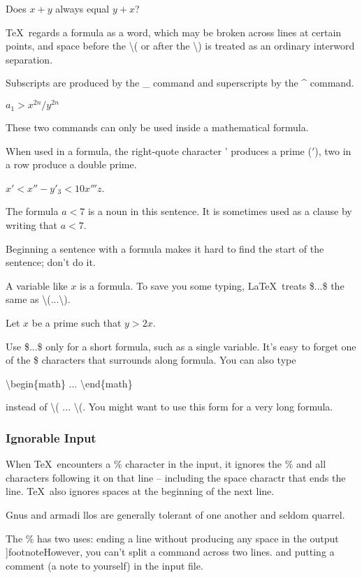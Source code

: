 \documentclass[twocolumn]{article}        %
\begin{document}
Does \( x + y \) always equal \(y+x\)?

\TeX\ regards a formula as a word, which may be broken across lines at certain points, 
and space before the \textbackslash (  or after the \textbackslash ) is treated as an 
ordinary interword separation.

Subscripts are produced by the \_ command and superscripts by the \^{} command.

\( a_{1} > x^{2n} / y^{2n} \)

These two commands can only be used inside a mathematical formula.

When used in a formula, the right-quote character ' produces a prime (\('\)),
two in a row produce a double prime.

\break
\( x' < x'' - y'_{3} < 10 x''' z\).

The formula \( a<7 \) is a noun in this sentence.
It is sometimes used as a clause by writing that \( a<7 \).

Beginning a sentence with a formula makes it hard to find the start of the 
sentence; don't do it.

A variable like \( x \) is a formula. To save you some typing, \LaTeX\ treats
\$...\$ the same as \textbackslash (...\textbackslash ).

Let $x$ be a prime such that $y>2x$.

Use \$...\$ only for a short formula, such as a single variable. 
It's easy to forget one of the \$ characters that surrounds along formula.
You can also type

\textbackslash begin\{math\} ... \textbackslash end\{math\}

\noindent
instead of \textbackslash ( ... \textbackslash (. You might want to use this form 
for a very long formula.

\subsubsection*{Ignorable Input}

When \TeX\ encounters a \% character in the input, it ignores the \% and all 
characters following it on that line -- including the space charactr that ends the line.
\TeX\ also ignores spaces at the beginning of the next line.

Gnus and armadi%
llos are generally tolerant of one another and seldom quarrel.

The \% has two uses: ending a line without producing any space in the output
]footnote{However, you can't split a command across two lines.}
and putting a comment (a note to yourself) in the input file.
\end{document}
